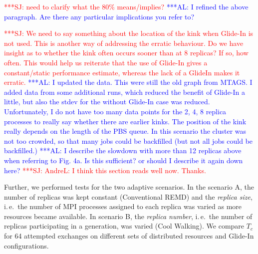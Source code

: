 \documentclass{rspublic}
\newcommand{\alnote}[1]{ {\textcolor{blue} { ***AL: #1 }}}
\newcommand{\jhanote}[1]{ {\textcolor{red} { ***SJ: #1 }}}
\newcommand{\alnote}[1]{}
\newcommand{\jhanote}[1]{}
\begin{document}
\jhanote{need to clarify what the 80\% means/implies?} \alnote{I
  refined the above paragraph. Are there any particular implications
  you refer to?}

\jhanote{We need to say something about the location of the kink when
  Glide-In is not used. This is another way of addressing the erratic
  behaviour. Do we have insight as to whether the kink often occurs
  sooner than at 8 replicas? If so, how often.  This would help us
  reiterate that the use of Glide-In gives a constant/static
  performance estimate, whereas the lack of a GlideIn makes it
  erratic.}  \alnote{I updated the data. This were still the old graph
  from MTAGS. I added data from some additional runs, which reduced
  the benefit of Glide-In a little, but also the stdev for the without
  Glide-In case was reduced. Unfortunately, I do not have too many
  data points for the 2, 4, 8 replica processes to really say whether
  there are earlier kinks.  The position of the kink really depends on
  the length of the PBS queue. In this scenario the cluster was not
  too crowded, so that many jobs could be backfilled (but not all jobs
  could be backfilled.)}  \alnote{I describe the slowdown with more
  than 12 replicas above when referring to Fig. 4a. Is this
  sufficient? or should I describe it again down here?}
\jhanote{AndreL: I think this section reads well now. Thanks.}

Further, we performed tests for the two adaptive scenarios.
In the scenario A, the number of replicas was kept constant
(Conventional REMD) and the \emph{replica size}, i.\,e.\ the number of
MPI processes assigned to each replica was varied as more resources
became available.  In scenario B, the \emph{replica number}, i.\,e.\ the
number of replicas participating in a generation, was varied (Cool
Walking).  We compare $T_{c}$ for 64 attempted exchanges on different sets of
distributed resources and Glide-In configurations.
                    
\end{document}
